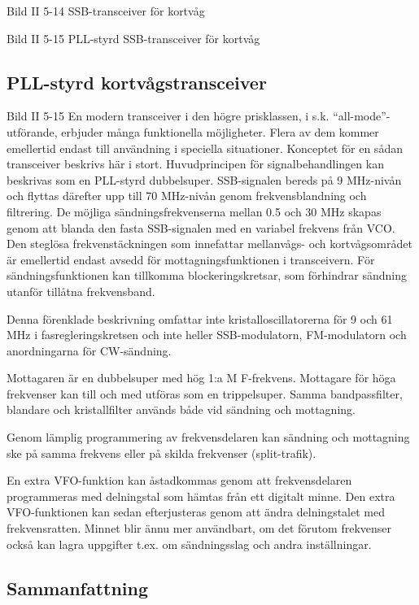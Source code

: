 Bild II 5-14 SSB-transceiver för kortvåg

Bild II 5-15 PLL-styrd SSB-transceiver för kortvåg

\subsection{PLL-styrd kortvågstransceiver}

Bild II 5-15 En modern transceiver i den högre prisklassen, i
s.k. ``all-mode''-utförande, erbjuder många funktionella
möjligheter. Flera av dem kommer emellertid endast till användning i
speciella situationer. Konceptet för en sådan transceiver beskrivs här
i stort.  Huvudprincipen för signalbehandlingen kan beskrivas som en
PLL-styrd dubbelsuper.  SSB-signalen bereds på 9 MHz-nivån och flyttas
därefter upp till 70 MHz-nivån genom frekvensblandning och
filtrering. De möjliga sändningsfrekvenserna mellan 0.5 och 30 MHz
skapas genom att blanda den fasta SSB-signalen med en variabel
frekvens från VCO. Den steglösa frekvenstäckningen som innefattar
mellanvågs- och kortvågsområdet är emellertid endast avsedd för
mottagningsfunktionen i transceivern. För sändningsfunktionen kan
tillkomma blockeringskretsar, som förhindrar sändning utanför tillåtna
frekvensband.

Denna förenklade beskrivning omfattar inte kristalloscillatorerna för
9 och 61 MHz i fasregleringskretsen och inte heller SSB-modulatorn,
FM-modulatorn och anordningarna för CW-sändning.

Mottagaren är en dubbelsuper med hög 1:a M F-frekvens. Mottagare för
höga frekvenser kan till och med utföras som en trippelsuper. Samma
bandpassfilter, blandare och kristallfilter används både vid sändning
och mottagning.

Genom lämplig programmering av frekvensdelaren kan sändning och
mottagning ske på samma frekvens eller på skilda frekvenser
(split-trafik).

En extra VFO-funktion kan åstadkommas genom att frekvensdelaren
programmeras med delningstal som hämtas från ett digitalt minne. Den
extra VFO-funktionen kan sedan efterjusteras genom att ändra
delningstalet med frekvensratten. Minnet blir ännu mer användbart, om
det förutom frekvenser också kan lagra uppgifter t.ex.  om
sändningsslag och andra inställningar.

\subsection{Sammanfattning}

